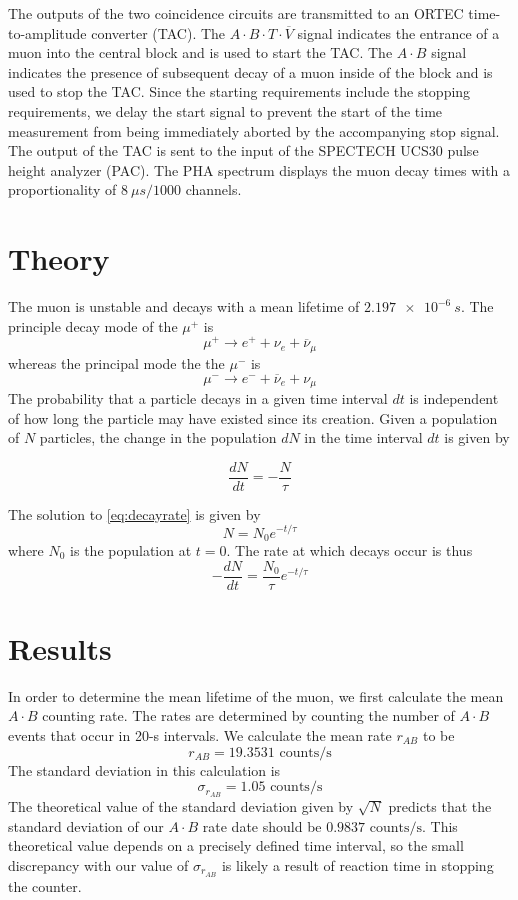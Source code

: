 \documentclass[aps, reprint,amsmath,amssymb]{revtex4-1} %
\begin{document}
The outputs of the two coincidence circuits are transmitted to an ORTEC time-to-amplitude converter (TAC). The $A \cdot B \cdot T \cdot \overline{V}$ signal indicates the entrance of a muon into the central block and is used to start the TAC. The $A \cdot B$ signal indicates the presence of subsequent decay of a muon inside of the block and is used to stop the TAC. Since the starting requirements include the stopping requirements, we delay the start signal to prevent the start of the time measurement from being immediately aborted by the accompanying stop signal. The output of the TAC is sent to the input of the SPECTECH UCS30 pulse height analyzer (PAC). The PHA spectrum displays the muon decay times with a proportionality of $\SI{8}{\mu s}/1000$ channels.

\section{Theory}

The muon is unstable and decays with a mean lifetime of $\SI{2.197e-6}{s}$. The principle decay mode of the $\mu^+$ is
\[
	\mu^+ \rightarrow e^+ + \nu_e + \overline{\nu}_{\mu}
\]
whereas the principal mode the the $\mu^-$ is
\[
	\mu^- \rightarrow e^- + \overline{\nu}_e + \nu_{\mu}
\]
The probability that a particle decays in a given time interval $dt$ is independent of how long the particle may have existed since its creation. Given a population of $N$ particles, the change in the population $dN$ in the time interval $dt$ is given by

\begin{equation} \label{eq:decayrate}
    \frac{dN}{dt} = - \frac{N}{\tau}
\end{equation}

The solution to \eqref{eq:decayrate} is given by
\[
	N = N_0 e^{-t/\tau}
\]
where $N_0$ is the population at $t=0$. The rate at which decays occur is thus
\[
	-\frac{dN}{dt} = \frac{N_0}{\tau} e^{-t/\tau}
\]


\section{Results}

In order to determine the mean lifetime of the muon, we first calculate the mean $A \cdot B$ counting rate. The rates are determined by counting the number of $A \cdot B$ events that occur in 20-s intervals. We calculate the mean rate $r_{AB}$ to be
\[
	r_{AB} = 19.3531 \text{ counts}/\text{s}
\]
The standard deviation in this calculation is
\[
	\sigma_{r_{AB}} = 1.05 \text{ counts}/\text{s}
\]
The theoretical value of the standard deviation given by $\sqrt{N}$ predicts that the standard deviation of our $A \cdot B$ rate date should be $0.9837 \text{ counts}/\text{s}$. This theoretical value depends on a precisely defined time interval, so the small discrepancy with our value of $\sigma_{r_{AB}}$ is likely a result of reaction time in stopping the counter. 
\end{document}
